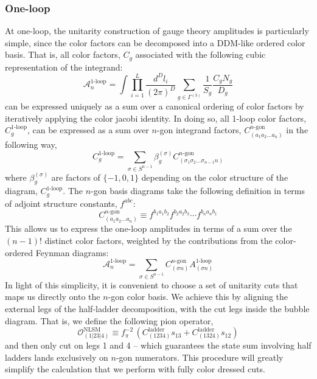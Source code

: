 \documentclass[12pt,letter]{article}
\def\be{\begin{equation}}
\def\ee{\end{equation}}
\begin{document}
\subsubsection{One-loop}\label{sec:1loopNLSM}
At one-loop, the unitarity construction of gauge theory amplitudes is particularly simple, since the color factors can be decomposed into a DDM-like ordered color basis. That is, all color factors, $C_g$ associated with the following cubic representation of the integrand:
\begin{equation}
\mathcal{A}^{1\text{-loop}}_{n} = \int \prod_{i=1}^L \frac{d^D l_i}{(2\pi)^D} \sum_{g\in \Gamma^{(3)}} \frac{1}{S_g}\frac{C_g N_g}{D_g}
\end{equation}
can be expressed uniquely as a sum over a canonical ordering of color factors by iteratively applying the color jacobi identity. In doing so, all 1-loop color factors, $C^{1\text{-loop}}_g$, can be expressed as a sum over $n$-gon integrand factors, $C^{n\text{-gon}}_{(a_1a_2...a_n)}$ in the following way,
\begin{equation}
C^{1\text{-loop}}_g = \sum_{\sigma\in S^{n-1}} \beta^{(\sigma)}_g C^{n\text{-gon}}_{(\sigma_{1}\sigma_{2}...\sigma_{n-1}n)} 
\end{equation}
where $\beta^{(\sigma)}_g$ are factors of $\{-1,0,1\}$ depending on the color structure of the diagram, $C^{1\text{-loop}}_g$. The $n$-gon basis diagrams take the following definition in terms of adjoint structure constants, $f^{abc}$:
\begin{equation}
C^{n\text{-gon}}_{(a_1a_2...a_n)} \equiv f^{b_1 a_1 b_2}f^{b_2 a_2 b_3}\cdots f^{b_{n} a_{n} b_1}
\end{equation}
This allows us to express the one-loop amplitudes in terms of a sum over the $(n-1)!$ distinct color factors, weighted by the contributions from the color-ordered Feynman diagrams:
\begin{equation}
\mathcal{A}^{1\text{-loop}}_n = \sum_{\sigma \in S^{n-1}} C^{n\text{-gon}}_{(\sigma n)} A^{1\text{-loop}}_{(\sigma n)}
\end{equation}
In light of this simplicity, it is convenient to choose a set of unitarity cuts that maps us directly onto the $n$-gon color basis. We achieve this by aligning the external legs of the half-ladder decomposition, with the cut legs inside the bubble diagram. That is, we define the following pion operator,
\be
 \mathcal{O}^{\text{NLSM}}_{(1|23|4)} \equiv f_\pi^{-2}\,\left(C^{\text{ladder}}_{(1234)} s_{13}+ C^{\text{ladder}}_{(1324)}s_{12}\right)
\ee
and then only cut on legs 1 and 4 -- which guarantees the state sum involving half ladders lands exclusively on $n$-gon numerators. This procedure will greatly simplify the calculation that we perform with fully color dressed cuts. 
\end{document}
